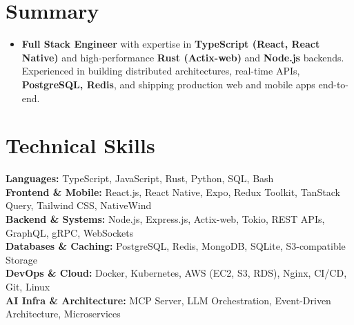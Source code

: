 \documentclass[a4paper,11pt]{article}
\newcommand{\resumeSubHeadingListStart}{\begin{itemize}[leftmargin=*,labelsep=0mm, itemsep=0mm, label={}]}
\newcommand{\resumeSubHeadingListEnd}{\end{itemize}\vspace{2mm}}
\begin{document}
\section{\textbf{Summary}}
 \resumeSubHeadingListStart
    \item{
        \textbf{Full Stack Engineer} with expertise in \textbf{TypeScript (React, React Native)} and high-performance \textbf{Rust (Actix-web)} and \textbf{Node.js} backends. Experienced in building distributed architectures, real-time APIs, \textbf{PostgreSQL, Redis}, and shipping production web and mobile apps end-to-end.
    }
 \resumeSubHeadingListEnd
\vspace{-16pt}

\section{\textbf{Technical Skills}}
 \begin{itemize}[leftmargin=0.05in, label={}]
    \small{\item{
    \textbf{Languages:} TypeScript, JavaScript, Rust, Python, SQL, Bash \\
    \textbf{Frontend \& Mobile:} React.js, React Native, Expo, Redux Toolkit, TanStack Query, Tailwind CSS, NativeWind \\
    \textbf{Backend \& Systems:} Node.js, Express.js, Actix-web, Tokio, REST APIs, GraphQL, gRPC, WebSockets \\
    \textbf{Databases \& Caching:} PostgreSQL, Redis, MongoDB, SQLite, S3-compatible Storage \\
    \textbf{DevOps \& Cloud:} Docker, Kubernetes, AWS (EC2, S3, RDS), Nginx, CI/CD, Git, Linux \\
    \textbf{AI Infra \& Architecture:} MCP Server, LLM Orchestration, Event-Driven Architecture, Microservices \\
    }}
 \end{itemize}
 \vspace{-16pt}
 
\end{document}
